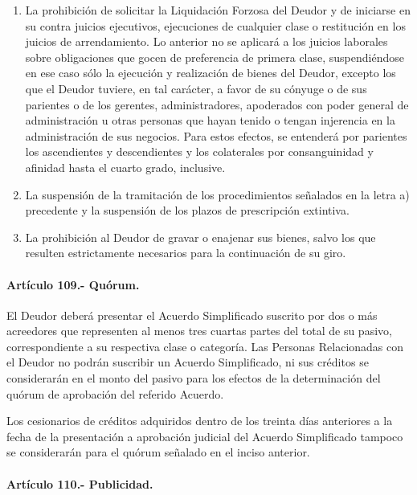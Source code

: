 \documentclass[
]{book}
\begin{document}
\begin{enumerate}
\def\labelenumi{\alph{enumi})}
\item
  La prohibición de solicitar la Liquidación Forzosa del Deudor y de iniciarse en su contra juicios ejecutivos, ejecuciones de cualquier clase o restitución en los juicios de arrendamiento. Lo anterior no se aplicará a los juicios laborales sobre obligaciones que gocen de preferencia de primera clase, suspendiéndose en ese caso sólo la ejecución y realización de bienes del Deudor, excepto los que el Deudor tuviere, en tal carácter, a favor de su cónyuge o de sus parientes o de los gerentes, administradores, apoderados con poder general de administración u otras personas que hayan tenido o tengan injerencia en la administración de sus negocios. Para estos efectos, se entenderá por parientes los ascendientes y descendientes y los colaterales por consanguinidad y afinidad hasta el cuarto grado, inclusive.
\item
  La suspensión de la tramitación de los procedimientos señalados en la letra a) precedente y la suspensión de los plazos de prescripción extintiva.
\item
  La prohibición al Deudor de gravar o enajenar sus bienes, salvo los que resulten estrictamente necesarios para la continuación de su giro.
\end{enumerate}

\hypertarget{artuxedculo-109.--quuxf3rum.}{%
\paragraph*{Artículo 109.- Quórum.}\label{artuxedculo-109.--quuxf3rum.}}

El Deudor deberá presentar el Acuerdo Simplificado suscrito por dos o más acreedores que representen al menos tres cuartas partes del total de su pasivo, correspondiente a su respectiva clase o categoría. Las Personas Relacionadas con el Deudor no podrán suscribir un Acuerdo Simplificado, ni sus créditos se considerarán en el monto del pasivo para los efectos de la determinación del quórum de aprobación del referido Acuerdo.

Los cesionarios de créditos adquiridos dentro de los treinta días anteriores a la fecha de la presentación a aprobación judicial del Acuerdo Simplificado tampoco se considerarán para el quórum señalado en el inciso anterior.

\hypertarget{artuxedculo-110.--publicidad.}{%
\paragraph*{Artículo 110.- Publicidad.}\label{artuxedculo-110.--publicidad.}}
\end{document}
